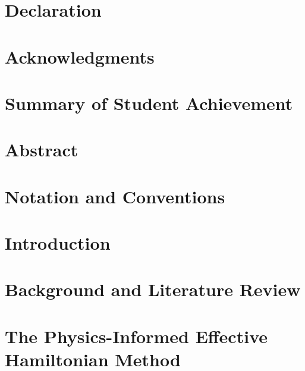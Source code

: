 \documentclass[12pt]{article}
\begin{document}

\clearpage
{}
\setcounter{page}{1}

\section*{Declaration}

\clearpage

\section*{Acknowledgments}

\clearpage

\section*{Summary of Student Achievement}

\clearpage

\justify

\section*{Abstract}

\clearpage

\listoffigures
\clearpage
\listoftables
\clearpage

\printacronyms[title=Acronyms]
\clearpage

\section*{Notation and Conventions}

\clearpage

\setcounter{tocdepth}{3}
\tableofcontents
\clearpage

\setcounter{page}{1}

\section{Introduction}
\label{sec:intro}


\section{Background and Literature Review}
\label{sec:background}


\section{The Physics-Informed Effective Hamiltonian Method}
\label{sec:pihm}

\end{document}
